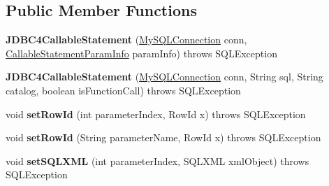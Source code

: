 \subsection*{Public Member Functions}
\begin{DoxyCompactItemize}
\item 
\mbox{\label{classcom_1_1mysql_1_1jdbc_1_1_j_d_b_c4_callable_statement_aa2569cd6e5d2d606346371457d550e19}} 
{\bfseries J\+D\+B\+C4\+Callable\+Statement} (\mbox{\hyperlink{interfacecom_1_1mysql_1_1jdbc_1_1_my_s_q_l_connection}{My\+S\+Q\+L\+Connection}} conn, \mbox{\hyperlink{classcom_1_1mysql_1_1jdbc_1_1_callable_statement_1_1_callable_statement_param_info}{Callable\+Statement\+Param\+Info}} param\+Info)  throws S\+Q\+L\+Exception 
\item 
\mbox{\label{classcom_1_1mysql_1_1jdbc_1_1_j_d_b_c4_callable_statement_aad51c36cc8f02becf846616712d57934}} 
{\bfseries J\+D\+B\+C4\+Callable\+Statement} (\mbox{\hyperlink{interfacecom_1_1mysql_1_1jdbc_1_1_my_s_q_l_connection}{My\+S\+Q\+L\+Connection}} conn, String sql, String catalog, boolean is\+Function\+Call)  throws S\+Q\+L\+Exception 
\item 
\mbox{\label{classcom_1_1mysql_1_1jdbc_1_1_j_d_b_c4_callable_statement_a8a379dd504cc3785c6b51ed597e14c10}} 
void {\bfseries set\+Row\+Id} (int parameter\+Index, Row\+Id x)  throws S\+Q\+L\+Exception 
\item 
\mbox{\label{classcom_1_1mysql_1_1jdbc_1_1_j_d_b_c4_callable_statement_ab547235edf7ce4f20aad1310be788798}} 
void {\bfseries set\+Row\+Id} (String parameter\+Name, Row\+Id x)  throws S\+Q\+L\+Exception 
\item 
\mbox{\label{classcom_1_1mysql_1_1jdbc_1_1_j_d_b_c4_callable_statement_a826bc3a37460c7628fb12977e665e732}} 
void {\bfseries set\+S\+Q\+L\+X\+ML} (int parameter\+Index, S\+Q\+L\+X\+ML xml\+Object)  throws S\+Q\+L\+Exception 
\item 
\mbox{\label{classcom_1_1mysql_1_1jdbc_1_1_j_d_b_c4_callable_statement_ad6f45d7b9aae4130e3ff78651892dd86}} 

\end{DoxyCompactItemize}
